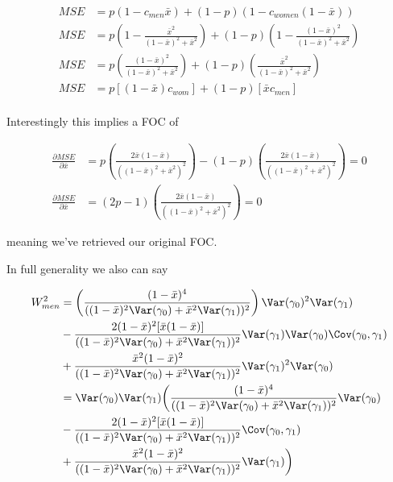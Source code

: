 \begin{align*}
	 MSE &= p (1 - c_{men} \bar{x}) + (1-p) (1 - c_{women} (1 - \bar{x})) \\
	 MSE &= p \left(1 - \frac{\bar{x}^2}{(1-\bar{x})^2 + \bar{x}^2}\right) + (1-p) \left(1 - \frac{(1-\bar{x})^2}{(1-\bar{x})^2 + \bar{x}^2} \right) \\
	 MSE &= p \left(\frac{(1 - \bar{x})^2}{(1-\bar{x})^2 + \bar{x}^2}\right) + (1-p) \left(\frac{\bar{x}^2}{(1-\bar{x})^2 + \bar{x}^2} \right) \\
	 MSE &= p \left[ (1 - \bar{x})c_{wom} \right] + (1-p) \left[ \bar{x}c_{men} \right] \\
\end{align*} 

Interestingly this implies a FOC of

\begin{align*}
	\frac{\partial MSE }{\partial \bar{x}} &= p \left(\frac{2 \bar{x} (1 - \bar{x})}{((1-\bar{x})^2 + \bar{x}^2)^2}\right) - (1-p) \left(\frac{2 \bar{x} (1 - \bar{x})}{((1-\bar{x})^2 + \bar{x}^2)^2} \right) = 0 \\
	\frac{\partial MSE}{\partial \bar{x}} &= (2p -1) \left(\frac{2 \bar{x} (1 - \bar{x})}{((1-\bar{x})^2 + \bar{x}^2)^2}\right) = 0
\end{align*} 

meaning we've retrieved our original FOC.

In full generality we also can say

\begin{align*}
	W_{men}^2 &= \left(\frac{(1 - \bar{x})^4}{((1-\bar{x})^2 \Var(\gamma_0) + \bar{x}^2 \Var(\gamma_1))^2}\right)\Var(\gamma_0)^2 \Var(\gamma_1)  \\
			  & -  \frac{2 (1 - \bar{x})^2[\bar{x} (1-\bar{x})]}{((1-\bar{x})^2 \Var(\gamma_0) + \bar{x}^2 \Var(\gamma_1))^2} \Var(\gamma_1) \Var(\gamma_0) \Cov(\gamma_0, \gamma_1)  \\
			  & + \frac{\bar{x}^2 (1-\bar{x})^2}{((1-\bar{x})^2 \Var(\gamma_0) + \bar{x}^2 \Var(\gamma_1))^2} \Var(\gamma_1)^2 \Var(\gamma_0) \\
			  &= \Var(\gamma_0) \Var(\gamma_1) \bigg(\frac{(1 - \bar{x})^4}{((1-\bar{x})^2 \Var(\gamma_0) + \bar{x}^2 \Var(\gamma_1))^2}\Var(\gamma_0)  \\
			  & -  \frac{2 (1 - \bar{x})^2[\bar{x} (1-\bar{x})]}{((1-\bar{x})^2 \Var(\gamma_0) + \bar{x}^2 \Var(\gamma_1))^2} \Cov(\gamma_0, \gamma_1)  \\
			  & + \frac{\bar{x}^2 (1-\bar{x})^2}{((1-\bar{x})^2 \Var(\gamma_0) + \bar{x}^2 \Var(\gamma_1))^2} \Var(\gamma_1) \bigg) \\
\end{align*} 


